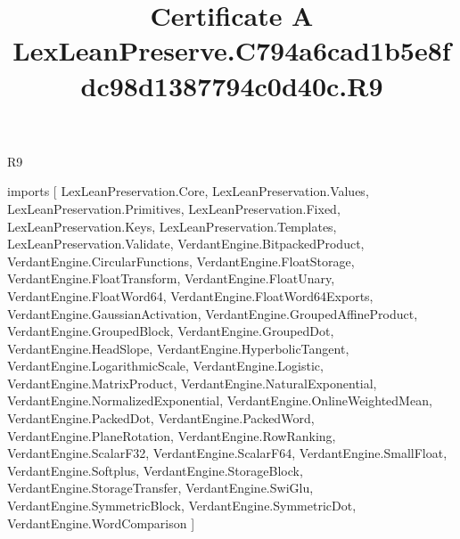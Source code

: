 \begin{lexlean}{R9}
\title{Certificate A LexLeanPreserve.C794a6cad1b5e8fdc98d1387794c0d40c.R9}
\begin{coremodule}
imports [
  LexLeanPreservation.Core,
  LexLeanPreservation.Values,
  LexLeanPreservation.Primitives,
  LexLeanPreservation.Fixed,
  LexLeanPreservation.Keys,
  LexLeanPreservation.Templates,
  LexLeanPreservation.Validate,
  VerdantEngine.BitpackedProduct,
  VerdantEngine.CircularFunctions,
  VerdantEngine.FloatStorage,
  VerdantEngine.FloatTransform,
  VerdantEngine.FloatUnary,
  VerdantEngine.FloatWord64,
  VerdantEngine.FloatWord64Exports,
  VerdantEngine.GaussianActivation,
  VerdantEngine.GroupedAffineProduct,
  VerdantEngine.GroupedBlock,
  VerdantEngine.GroupedDot,
  VerdantEngine.HeadSlope,
  VerdantEngine.HyperbolicTangent,
  VerdantEngine.LogarithmicScale,
  VerdantEngine.Logistic,
  VerdantEngine.MatrixProduct,
  VerdantEngine.NaturalExponential,
  VerdantEngine.NormalizedExponential,
  VerdantEngine.OnlineWeightedMean,
  VerdantEngine.PackedDot,
  VerdantEngine.PackedWord,
  VerdantEngine.PlaneRotation,
  VerdantEngine.RowRanking,
  VerdantEngine.ScalarF32,
  VerdantEngine.ScalarF64,
  VerdantEngine.SmallFloat,
  VerdantEngine.Softplus,
  VerdantEngine.StorageBlock,
  VerdantEngine.StorageTransfer,
  VerdantEngine.SwiGlu,
  VerdantEngine.SymmetricBlock,
  VerdantEngine.SymmetricDot,
  VerdantEngine.WordComparison
]


\end{coremodule}
\end{lexlean}
